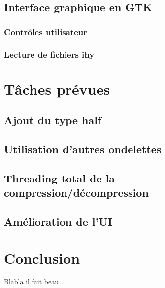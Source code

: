 \documentclass[a4paper,12pt]{article}
\begin{document}
	\subsection{Interface graphique en GTK}

		\subsubsection{Contrôles utilisateur}

		\subsubsection{Lecture de fichiers ihy}

\section{Tâches prévues}

	\subsection{Ajout du type half}

	\subsection{Utilisation d'autres ondelettes}

	\subsection{Threading total de la compression/décompression}

	\subsection{Amélioration de l'UI}

\newpage

\section*{Conclusion}
Blabla il fait beau ...
\end{document}

